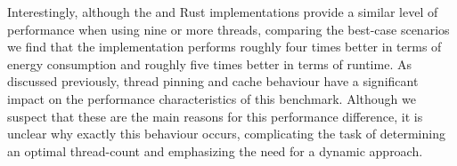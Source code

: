 Interestingly, although the \sac{} and Rust implementations provide a similar level of performance when using nine or more threads, comparing the best-case scenarios we find that the \sac{} implementation performs roughly four times better in terms of energy consumption and roughly five times better in terms of runtime.
As discussed previously, thread pinning and cache behaviour have a significant impact on the performance characteristics of this benchmark.
Although we suspect that these are the main reasons for this performance difference, it is unclear why exactly this behaviour occurs, complicating the task of determining an optimal thread-count and emphasizing the need for a dynamic approach.
